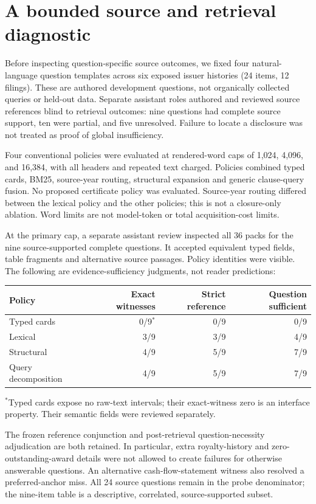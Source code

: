 \section{A bounded source and retrieval diagnostic}
Before inspecting question-specific source outcomes, we fixed four natural-language
question templates across six exposed issuer histories (24 items, 12 filings).
These are authored development questions, not organically collected queries or
held-out data. Separate assistant roles authored and reviewed source references
blind to retrieval outcomes: nine questions had complete source support, ten
were partial, and five unresolved. Failure to locate a disclosure was not treated
as proof of global insufficiency.

Four conventional policies were evaluated at rendered-word caps of 1,024, 4,096,
and 16,384, with all headers and repeated text charged. Policies combined typed
cards, BM25, source-year routing, structural expansion and generic clause-query
fusion. No proposed certificate policy was evaluated. Source-year routing differed
between the lexical policy and the other policies; this is not a closure-only
ablation. Word limits are not model-token or total acquisition-cost limits.

At the primary cap, a separate assistant review inspected all 36 packs for the
nine source-supported complete questions. It accepted equivalent typed fields,
table fragments and alternative source passages. Policy identities were visible.
The following are evidence-sufficiency judgments, not reader predictions:
\begin{center}
\begin{tabular}{lrrr}
\hline
Policy & Exact witnesses & Strict reference & Question sufficient \\
\hline
Typed cards & 0/9$^{*}$ & 0/9 & 0/9 \\
Lexical & 3/9 & 3/9 & 4/9 \\
Structural & 4/9 & 5/9 & 7/9 \\
Query decomposition & 4/9 & 5/9 & 7/9 \\
\hline
\end{tabular}
\end{center}
$^{*}$Typed cards expose no raw-text intervals; their exact-witness zero is an
interface property. Their semantic fields were reviewed separately.

The frozen reference conjunction and post-retrieval question-necessity
adjudication are both retained. In particular, extra royalty-history and
zero-outstanding-award details were not allowed to create failures for otherwise
answerable questions. An alternative cash-flow-statement witness also resolved
a preferred-anchor miss. All 24 source questions remain in the probe denominator;
the nine-item table is a descriptive, correlated, source-supported subset.

